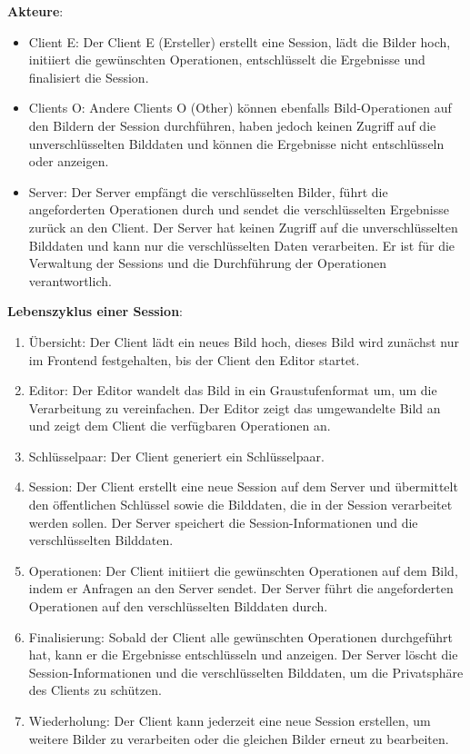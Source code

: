 \textbf{Akteure}:
\begin{itemize}
    \item Client E: Der Client E (Ersteller) erstellt eine Session, lädt die Bilder hoch, initiiert die gewünschten Operationen, entschlüsselt die Ergebnisse und finalisiert die Session. 
    \item Clients O: Andere Clients O (Other) können ebenfalls Bild-Operationen auf den Bildern der Session durchführen, haben jedoch keinen Zugriff auf die unverschlüsselten Bilddaten und können die Ergebnisse nicht entschlüsseln oder anzeigen. 
    \item Server: Der Server empfängt die verschlüsselten Bilder, führt die angeforderten Operationen durch und sendet die verschlüsselten Ergebnisse zurück an den Client. Der Server hat keinen Zugriff auf die unverschlüsselten Bilddaten und kann nur die verschlüsselten Daten verarbeiten. Er ist für die Verwaltung der Sessions und die Durchführung der Operationen verantwortlich.
\end{itemize}

\textbf{Lebenszyklus einer Session}:
\begin{enumerate}
    \item Übersicht: Der Client lädt ein neues Bild hoch, dieses Bild wird zunächst nur im Frontend festgehalten, bis der Client den Editor startet.
    \item Editor: Der Editor wandelt das Bild in ein Graustufenformat um, um die Verarbeitung zu vereinfachen. Der Editor zeigt das umgewandelte Bild an und zeigt dem Client die verfügbaren Operationen an. 
    \item Schlüsselpaar: Der Client generiert ein Schlüsselpaar.
    \item Session: Der Client erstellt eine neue Session auf dem Server und übermittelt den öffentlichen Schlüssel sowie die Bilddaten, die in der Session verarbeitet werden sollen. Der Server speichert die Session-Informationen und die verschlüsselten Bilddaten.
    \item Operationen: Der Client initiiert die gewünschten Operationen auf dem Bild, indem er Anfragen an den Server sendet. Der Server führt die angeforderten Operationen auf den verschlüsselten Bilddaten durch.
    \item Finalisierung: Sobald der Client alle gewünschten Operationen durchgeführt hat, kann er die Ergebnisse entschlüsseln und anzeigen. Der Server löscht die Session-Informationen und die verschlüsselten Bilddaten, um die Privatsphäre des Clients zu schützen.
    \item Wiederholung: Der Client kann jederzeit eine neue Session erstellen, um weitere Bilder zu verarbeiten oder die gleichen Bilder erneut zu bearbeiten.
\end{enumerate}

